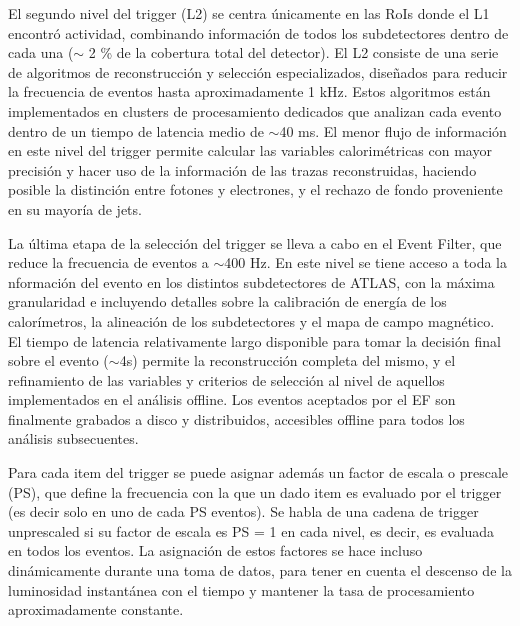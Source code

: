 El segundo nivel del trigger (L2) se centra únicamente en las RoIs donde el L1 encontró actividad, combinando información de todos los subdetectores dentro de cada una ($\sim$ 2 \% de la cobertura total del detector). El L2 consiste de una serie de algoritmos de reconstrucción y selección especializados, diseñados para reducir la frecuencia de eventos hasta aproximadamente 1 kHz. Estos algoritmos están implementados en clusters de procesamiento dedicados que analizan cada evento dentro de un tiempo de latencia medio de $\sim$40 ms. El menor flujo de información en este nivel del trigger permite calcular las variables calorimétricas con mayor precisión y hacer uso de la información de las trazas reconstruidas, haciendo posible la distinción entre fotones y electrones, y el rechazo de fondo proveniente en su mayoría de jets.

La última etapa de la selección del trigger se lleva a cabo en el Event Filter, que reduce la frecuencia de eventos a $\sim$400 Hz. En este nivel se tiene acceso a toda la  nformación del evento en los distintos subdetectores de ATLAS, con la máxima granularidad e incluyendo detalles sobre la calibración de energía de los calorímetros, la alineación de los subdetectores y el mapa de campo magnético. El tiempo de latencia relativamente largo disponible para tomar la decisión final sobre el evento ($\sim$4s) permite la reconstrucción completa del mismo, y el refinamiento de las variables y criterios de selección al nivel de aquellos implementados en el análisis offline. Los eventos aceptados por el EF son finalmente grabados a disco y distribuidos, accesibles offline para todos los análisis subsecuentes.

Para cada item del trigger se puede asignar además un factor de escala o prescale (PS), que define la frecuencia con la que un dado item es evaluado por el trigger (es decir solo en uno de cada PS eventos). Se habla de una cadena de trigger unprescaled si su factor de escala es PS = 1 en cada nivel, es decir, es evaluada en todos los eventos. La asignación de estos factores se hace incluso dinámicamente durante una toma de datos, para tener en cuenta el descenso de la luminosidad instantánea con el tiempo y mantener la tasa de procesamiento aproximadamente constante.
